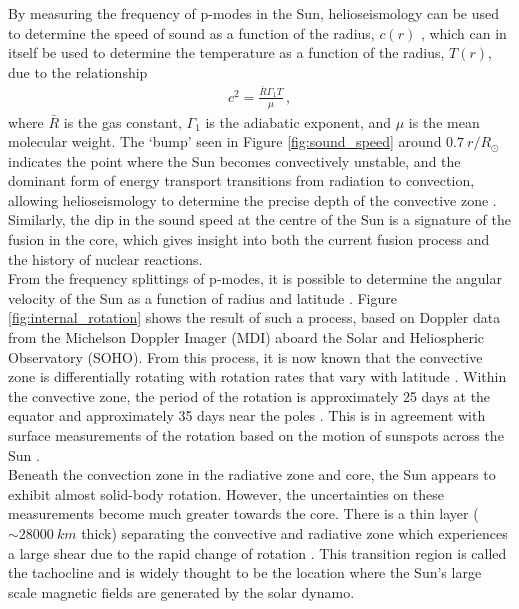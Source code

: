 \documentclass[11pt,a4paper,onecolumn]{report}
\begin{document}
By measuring the frequency of p-modes in the Sun, helioseismology can be used to determine
the speed of sound as a function of the radius, \(c\left(r\right)\)
\citep{christensen-dalsgaard_speed_1985}, which can in itself be used to
determine the temperature as a function of the radius, \(T\left(r\right)\), due
to the relationship
\begin{align}
  c^2 = \frac{\bar{R}\Gamma_1 T}{\mu} \,,
\end{align}
where \(\bar{R}\) is the gas constant, \(\Gamma_1\) is the adiabatic exponent,
and \(\mu\) is the mean molecular weight. The `bump' seen in Figure
\ref{fig:sound_speed} around \(\SI{0.7}{r \per R_\odot}\) indicates the point where the
Sun becomes convectively unstable, and the dominant form of energy transport
transitions from radiation to convection, allowing helioseismology to determine
the precise depth of the convective zone
\citep{christensen-dalsgaard_speed_1985}. Similarly, the dip in the sound speed
at the centre of the Sun is a signature of the fusion in the core, which gives
insight into both the current fusion process and the history of nuclear
reactions. \\




From the frequency splittings of p-modes, it is possible to determine the
angular velocity of the Sun as a function of radius and latitude
\citep{schou_helioseismic_1998}. Figure \ref{fig:internal_rotation} shows the
result of such a process, based on Doppler data from the Michelson Doppler
Imager (MDI) aboard the Solar and Heliospheric Observatory (SOHO). From this
process, it is now known that the convective zone is differentially rotating
with rotation rates that vary with latitude \citep{eff2012dynamics}. Within the
convective zone, the period of the rotation is approximately 25 days at the
equator and approximately 35 days near the poles \citep{hughes2007solar}. This
is in agreement with surface measurements of the rotation based on the motion of
sunspots across the Sun \citep{schou_helioseismic_1998}. \\


Beneath the convection zone in the radiative zone and core, the Sun appears to
exhibit almost solid-body rotation. However, the uncertainties on these
measurements become much greater towards the core. There is a thin layer
(\(\sim \SI{28000}{km}\) thick) separating the convective and radiative zone which
experiences a large shear due to the rapid change of rotation
\citep{spiegel1992}. This transition region is called the tachocline and is
widely thought to be the location where the Sun's large scale magnetic fields are
generated by the solar dynamo.
\end{document}
